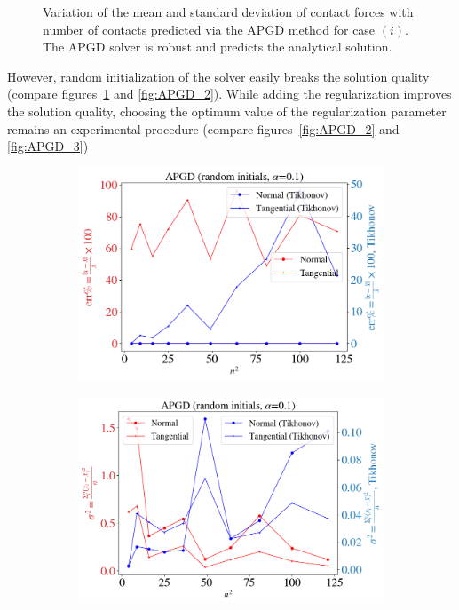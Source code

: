\begin{itemize}
\begin{figure}[H]
\begin{subfigure}{0.48\columnwidth}
		\end{subfigure}
		\caption{Variation of the mean and standard deviation of contact forces with number of contacts predicted via the APGD method for case $(i)$. The APGD solver is robust and predicts the analytical solution.}\label{fig:APGD_1}
	\end{figure}
	However, random initialization of the solver easily breaks the solution quality (compare figures~\ref{fig:APGD_1} and \ref{fig:APGD_2}). While adding the regularization improves the solution quality, choosing the optimum value of the regularization parameter remains an experimental procedure (compare figures~\ref{fig:APGD_2} and \ref{fig:APGD_3})
	\begin{figure}[H]
		\centering	
		\begin{subfigure}{0.48\columnwidth}	
			\centering
			\includegraphics[width=1.0\textwidth]{images/CD/APGD_r_01_mean.png}
		\end{subfigure}
		\begin{subfigure}{0.48\columnwidth}	
			\centering
			\includegraphics[width=1.0\textwidth]{images/CD/APGD_r_01_std.png}

\end{subfigure}
\end{figure}
\end{itemize}
